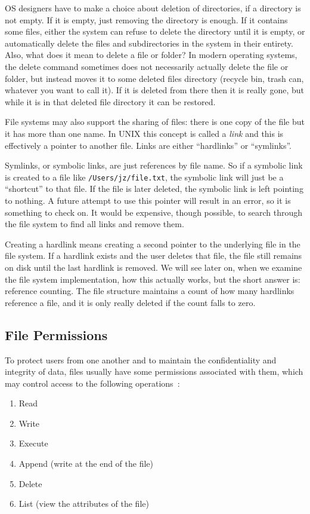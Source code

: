 OS designers have to make a choice about deletion of directories, if a directory is not empty. If it is empty, just removing the directory is enough. If it contains some files, either the system can refuse to delete the directory until it is empty, or automatically delete the files and subdirectories in the system in their entirety. Also, what does it mean to delete a file or folder? In modern operating systems, the delete command sometimes does not necessarily actually delete the file or folder, but instead moves it to some deleted files directory (recycle bin, trash can, whatever you want to call it). If it is deleted from there then it is really gone, but while it is in that deleted file directory it can be restored.

File systems may also support the sharing of files: there is one copy of the file but it has more than one name. In UNIX this concept is called a \textit{link} and this is effectively a pointer to another file. Links are either ``hardlinks'' or ``symlinks''. 

Symlinks, or symbolic links, are just references by file name. So if a symbolic link is created to a file like \texttt{/Users/jz/file.txt}, the symbolic link will just be a ``shortcut'' to that file. If the file is later deleted, the symbolic link is left pointing to nothing. A future attempt to use this pointer will result in an error, so it is something to check on. It would be expensive, though possible, to search through the file system to find all links and remove them.

Creating a hardlink means creating a second pointer to the underlying file in the file system. If a hardlink exists and the user deletes that file, the file still remains on disk until the last hardlink is removed. We will see later on, when we examine the file system implementation, how this actually works, but the short answer is: reference counting. The file structure maintains a count of how many hardlinks reference a file, and it is only really deleted if the count falls to zero.

\subsection*{File Permissions}
To protect users from one another and to maintain the confidentiality and integrity of data, files usually have some permissions associated with them, which may control access to the following operations~\cite{osc}:

\begin{enumerate}
	\item Read
	\item Write
	\item Execute
	\item Append (write at the end of the file)
	\item Delete
	\item List (view the attributes of the file)
\end{enumerate} 

